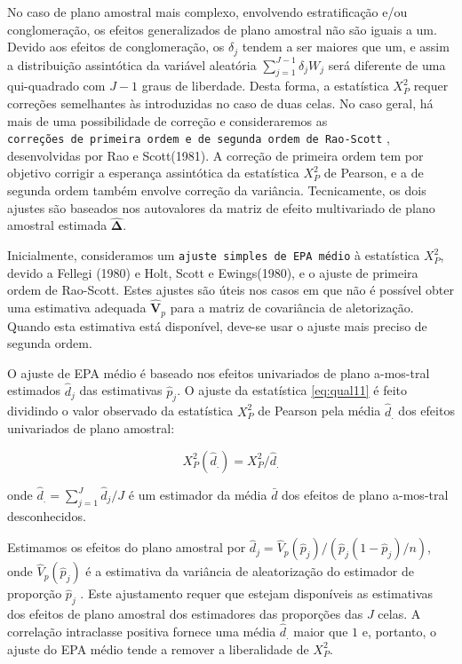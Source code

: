 \documentclass[]{book}
\numberwithin{example}{chapter}
\numberwithin{remark}{chapter}
\numberwithin{definition}{chapter}
\begin{document}
No caso de plano amostral mais complexo, envolvendo estratificação e/ou
conglomeração, os efeitos generalizados de plano amostral não são iguais
a um. Devido aos efeitos de conglomeração, os \(\delta _{j}\) tendem a
ser maiores que um, e assim a distribuição assintótica da variável
aleatória \(\sum_{j=1}^{J-1}\delta_{j}W_{j}\) será diferente de uma
qui-quadrado com \(J-1\) graus de liberdade. Desta forma, a estatística
\(X_{P}^{2}\) requer correções semelhantes às introduzidas no caso de
duas celas. No caso geral, há mais de uma possibilidade de correção e
consideraremos as
\texttt{correções\ de\ primeira\ ordem\ e\ de\ segunda\ ordem\ de\ Rao-Scott}
, desenvolvidas por Rao e Scott(1981). A correção de primeira ordem tem
por objetivo corrigir a esperança assintótica da estatística
\(X_{P}^{2}\) de Pearson, e a de segunda ordem também envolve correção
da variância. Tecnicamente, os dois ajustes são baseados nos autovalores
da matriz de efeito multivariado de plano amostral estimada
\(\widehat{\mathbf{\Delta }}\).

Inicialmente, consideramos um \texttt{ajuste\ simples\ de\ EPA\ médio} à
estatística \(X_{P}^{2}\), devido a Fellegi (1980) e Holt, Scott e
Ewings(1980), e o ajuste de primeira ordem de Rao-Scott. Estes ajustes
são úteis nos casos em que não é possível obter uma estimativa adequada
\(\mathbf{\hat{V}}_{p}\) para a matriz de covariância de aletorização.
Quando esta estimativa está disponível, deve-se usar o ajuste mais
preciso de segunda ordem.

O ajuste de EPA médio é baseado nos efeitos univariados de plano
a-mos-tral estimados \(\hat{d}_{j}\) das estimativas \(\hat{p}_{j}\). O
ajuste da estatística \eqref{eq:qual11} é feito dividindo o valor
observado da estatística \(X_{P}^{2}\) de Pearson pela média
\(\hat{d}_{.}\) dos efeitos univariados de plano amostral:

\begin{equation}
X_{P}^{2}\left( \hat{d}_{.}\right) =X_{P}^{2}/\hat{d}_{.}  
\label{eq:qual12}
\end{equation}

onde \(\hat{d}_{.}=\sum_{j=1}^{J}\hat{d}_{j}/J\) é um estimador da média
\(\bar{d}\) dos efeitos de plano a-mos-tral desconhecidos.

Estimamos os efeitos do plano amostral por
\(\hat{d}_{j}=\hat{V}_{p}\left(\hat{p}_{j}\right) /\left( \hat{p}_{j}\left( 1-\hat{p}_{j}\right) /n\right)\),
onde \(\hat{V}_{p}\left( \hat{p}_{j}\right)\) é a estimativa da
variância de aleatorização do estimador de proporção \(\hat{p}_{j}\) .
Este ajustamento requer que estejam disponíveis as estimativas dos
efeitos de plano amostral dos estimadores das proporções das \(J\)
celas. A correlação intraclasse positiva fornece uma média
\(\hat{d}_{.}\) maior que \(1\) e, portanto, o ajuste do EPA médio tende
a remover a liberalidade de \(X_{P}^{2}\).
\end{document}
